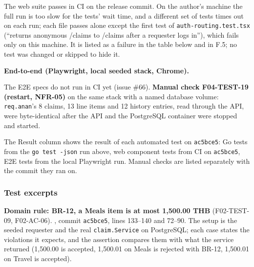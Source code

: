 The web suite passes in CI on the release commit. On the author's machine the full run is too slow for the tests' wait time, and a different set of tests times out on each run; each file passes alone except the first test of \texttt{auth-routing.test.tsx} (``returns anonymous /claims to /claims after a requester logs in''), which fails only on this machine. It is listed as a failure in the table below and in F.5; no test was changed or skipped to hide it.

\textbf{End-to-end (Playwright, local seeded stack, Chrome).}


The E2E specs do not run in CI yet (issue \#66).
\textbf{Manual check F04-TEST-19 (restart, NFR-05)} on the same stack with a named database volume: \texttt{req.anan}'s 8 claims, 13 line items and 12 history entries, read through the API, were byte-identical after the API and the PostgreSQL container were stopped and started.



\noindent The Result column shows the result of each automated test on \texttt{ac5bce5}: Go tests from the \texttt{go test -json} run above, web component tests from CI on \texttt{ac5bce5}, E2E tests from the local Playwright run. Manual checks are listed separately with the commit they ran on.

\subsubsection*{Test excerpts}

\textbf{Domain rule: BR-12, a Meals item is at most 1,500.00 THB} (F02-TEST-09, F02-AC-06).
, commit \texttt{ac5bce5}, lines 133--140 and 72--90.
The setup is the seeded requester and the real \texttt{claim.Service} on PostgreSQL; each case states the violations it expects, and the assertion compares them with what the service returned (1,500.00 is accepted, 1,500.01 on Meals is rejected with BR-12, 1,500.01 on Travel is accepted).


